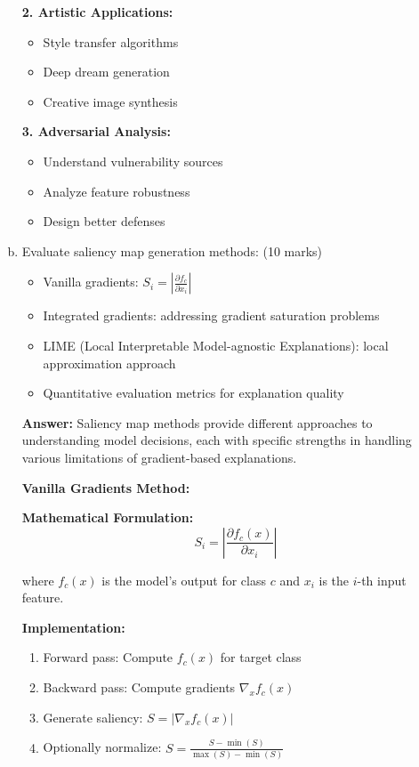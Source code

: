 \documentclass[12pt]{article}
\newcommand{\answer}[1]{{\color{answercolor}\textbf{Answer:} #1}}
\newcommand{\explanation}[1]{{\color{explanationcolor}#1}}
\begin{document}
\begin{enumerate}[(a)]
{    \textbf{2. Artistic Applications:}
    \begin{itemize}
        \item Style transfer algorithms
        \item Deep dream generation
        \item Creative image synthesis
    \end{itemize}
    
    \textbf{3. Adversarial Analysis:}
    \begin{itemize}
        \item Understand vulnerability sources
        \item Analyze feature robustness
        \item Design better defenses
    \end{itemize}
    }
    
    \item Evaluate saliency map generation methods: \hfill (10 marks)
    \begin{itemize}
        \item Vanilla gradients: $S_i = \left|\frac{\partial f_c}{\partial x_i}\right|$
        \item Integrated gradients: addressing gradient saturation problems
        \item LIME (Local Interpretable Model-agnostic Explanations): local approximation approach
        \item Quantitative evaluation metrics for explanation quality
    \end{itemize}
    
    \answer{Saliency map methods provide different approaches to understanding model decisions, each with specific strengths in handling various limitations of gradient-based explanations.}
    
    \explanation{
    \textbf{Vanilla Gradients Method:}
    
    \textbf{Mathematical Formulation:}
    $$S_i = \left|\frac{\partial f_c(x)}{\partial x_i}\right|$$
    
    where $f_c(x)$ is the model's output for class $c$ and $x_i$ is the $i$-th input feature.
    
    \textbf{Implementation:}
    \begin{enumerate}
        \item Forward pass: Compute $f_c(x)$ for target class
        \item Backward pass: Compute gradients $\nabla_x f_c(x)$
        \item Generate saliency: $S = |\nabla_x f_c(x)|$
        \item Optionally normalize: $S = \frac{S - \min(S)}{\max(S) - \min(S)}$
    \end{enumerate}
    
}
\end{enumerate}
\end{document}
